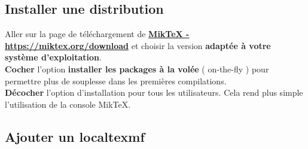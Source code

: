 \subsection{Installer une distribution}

\begin{tcbenumerate}[3]
    \tcbitem Aller sur la page de téléchargement de \href{https://miktex.org/download}{\bfseries\color{monrose}MikTeX - https://miktex.org/download} et choisir la version \textbf{adaptée à votre système d'exploitation}.\\
    \tcbitem \textbf{Cocher} l'option \textbf{installer les packages à la volée} ( on-the-fly ) pour permettre plus de souplesse dans les premières compilations.\\
    \tcbitem \textbf{Décocher} l'option d'installation pour tous les utilisateurs. Cela rend plus simple l'utilisation de la console MikTeX.
\end{tcbenumerate}

\subsection{Ajouter un localtexmf}

